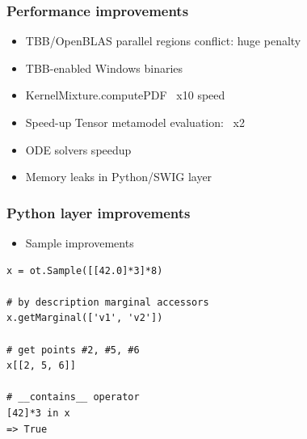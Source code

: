 \documentclass{beamer}
\begin{document}
\begin{frame}
\frametitle{Performance improvements}


\begin{itemize}
\item TBB/OpenBLAS parallel regions conflict: huge penalty
\item TBB-enabled Windows binaries
\item KernelMixture.computePDF ~x10 speed
\item Speed-up Tensor metamodel evaluation: ~x2
\item ODE solvers speedup
\item Memory leaks in Python/SWIG layer
\end{itemize}

% 

\end{frame}


\begin{frame}[containsverbatim]
\frametitle{Python layer improvements}

\lstset{language=python}

\begin{itemize}
\item Sample improvements
\end{itemize}
\begin{lstlisting}
x = ot.Sample([[42.0]*3]*8)

# by description marginal accessors
x.getMarginal(['v1', 'v2'])

# get points #2, #5, #6
x[[2, 5, 6]]

# __contains__ operator
[42]*3 in x
=> True
\end{lstlisting}

\end{frame}
\end{document}
